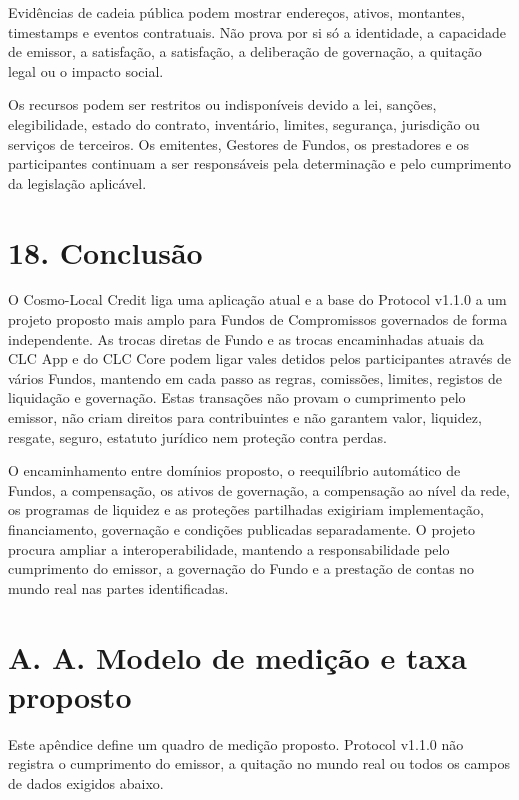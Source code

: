 \documentclass[11pt]{article}
\begin{document}
Evidências de cadeia pública podem mostrar endereços, ativos, montantes, timestamps e eventos contratuais. Não prova por si só a identidade, a capacidade de emissor, a satisfação, a satisfação, a deliberação de governação, a quitação legal ou o impacto social.

Os recursos podem ser restritos ou indisponíveis devido a lei, sanções, elegibilidade, estado do contrato, inventário, limites, segurança, jurisdição ou serviços de terceiros. Os emitentes, Gestores de Fundos, os prestadores e os participantes continuam a ser responsáveis pela determinação e pelo cumprimento da legislação aplicável.


\section*{18. Conclusão}

O Cosmo-Local Credit liga uma aplicação atual e a base do Protocol v1.1.0 a um projeto proposto mais amplo para Fundos de Compromissos governados de forma independente. As trocas diretas de Fundo e as trocas encaminhadas atuais da CLC App e do CLC Core podem ligar vales detidos pelos participantes através de vários Fundos, mantendo em cada passo as regras, comissões, limites, registos de liquidação e governação. Estas transações não provam o cumprimento pelo emissor, não criam direitos para contribuintes e não garantem valor, liquidez, resgate, seguro, estatuto jurídico nem proteção contra perdas.

O encaminhamento entre domínios proposto, o reequilíbrio automático de Fundos, a compensação, os ativos de governação, a compensação ao nível da rede, os programas de liquidez e as proteções partilhadas exigiriam implementação, financiamento, governação e condições publicadas separadamente. O projeto procura ampliar a interoperabilidade, mantendo a responsabilidade pelo cumprimento do emissor, a governação do Fundo e a prestação de contas no mundo real nas partes identificadas.


\section*{A. A. Modelo de medição e taxa proposto}

Este apêndice define um quadro de medição proposto. Protocol v1.1.0 não registra o cumprimento do emissor, a quitação no mundo real ou todos os campos de dados exigidos abaixo.
\end{document}
